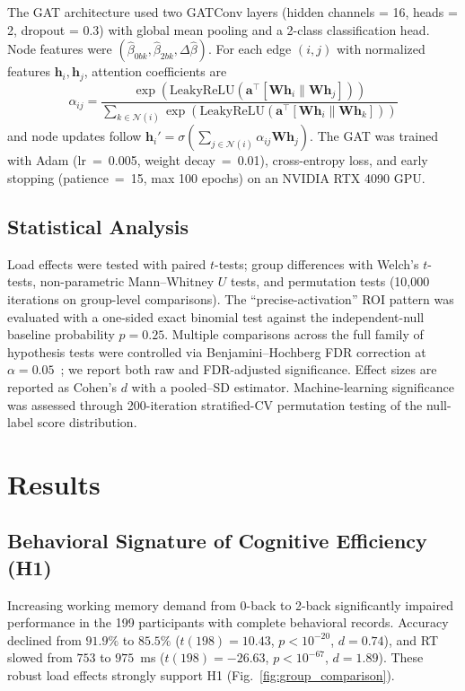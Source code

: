 \documentclass[conference]{IEEEtran}
\begin{document}
The GAT architecture used two GATConv layers (hidden channels = 16, heads = 2, dropout = 0.3) with global mean pooling and a 2-class classification head. Node features were $(\hat{\beta}_{0bk}, \hat{\beta}_{2bk}, \Delta\hat{\beta})$. For each edge $(i,j)$ with normalized features $\mathbf{h}_i, \mathbf{h}_j$, attention coefficients are
\begin{equation}
\alpha_{ij} = \frac{\exp(\mathrm{LeakyReLU}(\mathbf{a}^{\!\top}[\mathbf{W}\mathbf{h}_i\|\mathbf{W}\mathbf{h}_j]))}{\sum_{k \in \mathcal{N}(i)} \exp(\mathrm{LeakyReLU}(\mathbf{a}^{\!\top}[\mathbf{W}\mathbf{h}_i\|\mathbf{W}\mathbf{h}_k]))}
\end{equation}
and node updates follow $\mathbf{h}_i' = \sigma\!\left(\sum_{j \in \mathcal{N}(i)} \alpha_{ij} \mathbf{W} \mathbf{h}_j\right)$. The GAT was trained with Adam (lr~=~0.005, weight decay~=~0.01), cross-entropy loss, and early stopping (patience~=~15, max 100 epochs) on an NVIDIA RTX 4090 GPU.

\subsection{Statistical Analysis}
Load effects were tested with paired $t$-tests; group differences with Welch's $t$-tests, non-parametric Mann--Whitney $U$ tests, and permutation tests (10{,}000 iterations on group-level comparisons). The ``precise-activation'' ROI pattern was evaluated with a one-sided exact binomial test against the independent-null baseline probability $p=0.25$. Multiple comparisons across the full family of hypothesis tests were controlled via Benjamini--Hochberg FDR correction at $\alpha=0.05$~\cite{benjamini1995controlling}; we report both raw and FDR-adjusted significance. Effect sizes are reported as Cohen's $d$ with a pooled--SD estimator. Machine-learning significance was assessed through 200-iteration stratified-CV permutation testing of the null-label score distribution.

\section{Results}

\subsection{Behavioral Signature of Cognitive Efficiency (H1)}

Increasing working memory demand from 0-back to 2-back significantly impaired performance in the 199 participants with complete behavioral records. Accuracy declined from $91.9\%$ to $85.5\%$ ($t(198)=10.43$, $p<10^{-20}$, $d=0.74$), and RT slowed from $753$ to $975$~ms ($t(198)=-26.63$, $p<10^{-67}$, $d=1.89$). These robust load effects strongly support H1 (Fig.~\ref{fig:group_comparison}).
\end{document}
